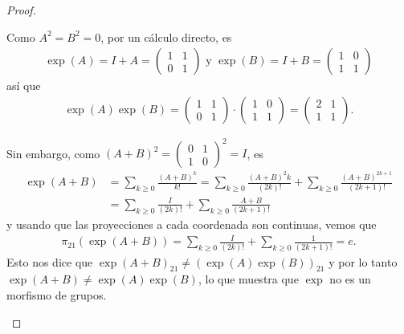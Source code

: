 \documentclass[11pt]{article}
\begin{document}
\begin{proof}
\begin{itemize}[listparindent = \parindent]
Como $A^2 = B^2 = 0$, por un c\'alculo directo, es
\begin{align*}
\exp(A) = I + A = \begin{pmatrix}
1 & 1\\
0 & 1
\end{pmatrix} \text{ y } \exp(B) = I + B = \begin{pmatrix}
1 & 0\\
1 & 1
\end{pmatrix}
\end{align*}
as\'i que 
\begin{align*}
\exp(A)\exp(B) = \begin{pmatrix}
1 & 1\\
0 & 1
\end{pmatrix} \cdot \begin{pmatrix}
1 & 0\\
1 & 1
\end{pmatrix} = \begin{pmatrix}
2 & 1\\
1 & 1
\end{pmatrix}.
\end{align*}

Sin embargo, como $(A+B)^2 = \begin{pmatrix}
0 & 1\\
1 & 0
\end{pmatrix}^2 = I$, es
\begin{align*}
\exp(A+B) &= \sum_{k \geq 0}\frac{(A+B)^k}{k!} = \sum_{k \geq 0}\frac{(A+B)^2k}{(2k)!} + \sum_{k \geq 0}\frac{(A+B)^{2k+1}}{(2k+1)!}\\
&= \sum_{k \geq 0}\frac{I}{(2k)!} + \sum_{k \geq 0}\frac{A+B}{(2k+1)!}
\end{align*}
y usando que las proyecciones a cada coordenada son continuas, vemos que
\begin{align*}
\pi_{21}(\exp(A+B)) = \sum_{k \geq 0}\frac{I}{(2k)!} + \sum_{k \geq 0}\frac{1}{(2k+1)!} = e.
\end{align*}
Esto nos dice que $\exp(A+B)_{21} \neq (\exp(A)\exp(B))_{21}$ y por lo tanto $\exp(A+B) \neq \exp(A)\exp(B)$, lo que muestra que $\exp$ no es un morfismo de grupos.
\end{itemize}
\end{proof}
\end{document}
